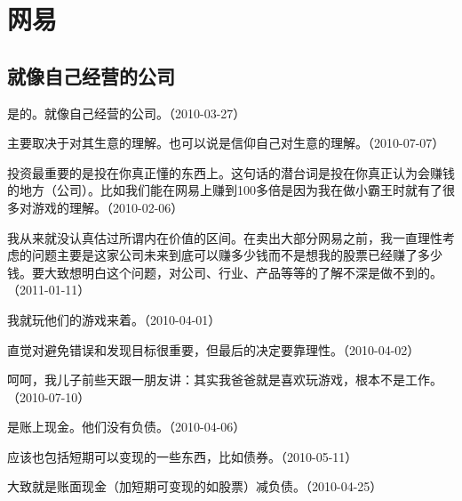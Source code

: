 
\section{网易}

\subsection{就像自己经营的公司}


是的。就像自己经营的公司。（2010-03-27）


主要取决于对其生意的理解。也可以说是信仰自己对生意的理解。（2010-07-07）

投资最重要的是投在你真正懂的东西上。这句话的潜台词是投在你真正认为会赚钱的地方（公司）。比如我们能在网易上赚到100多倍是因为我在做小霸王时就有了很多对游戏的理解。（2010-02-06）

我从来就没认真估过所谓内在价值的区间。在卖出大部分网易之前，我一直理性考虑的问题主要是这家公司未来到底可以赚多少钱而不是想我的股票已经赚了多少钱。要大致想明白这个问题，对公司、行业、产品等等的了解不深是做不到的。（2011-01-11）


我就玩他们的游戏来着。（2010-04-01）

直觉对避免错误和发现目标很重要，但最后的决定要靠理性。（2010-04-02）


呵呵，我儿子前些天跟一朋友讲：其实我爸爸就是喜欢玩游戏，根本不是工作。（2010-07-10）


是账上现金。他们没有负债。（2010-04-06）


应该也包括短期可以变现的一些东西，比如债券。（2010-05-11）


大致就是账面现金（加短期可变现的如股票）减负债。（2010-04-25）



